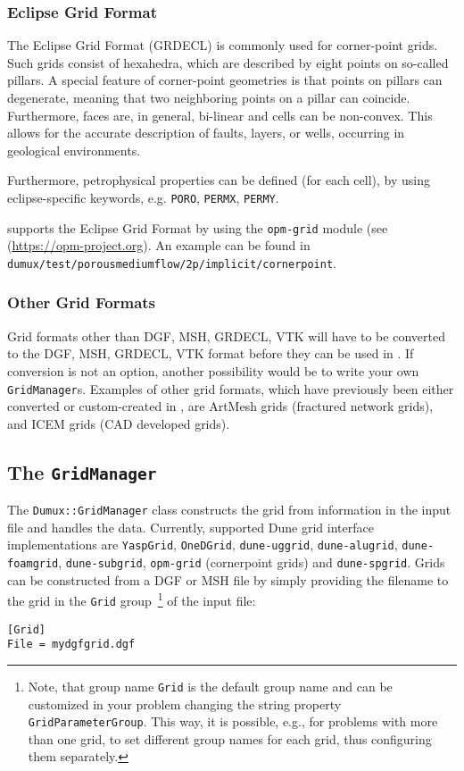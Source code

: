 \subsubsection{Eclipse Grid Format}
The Eclipse Grid Format (GRDECL) is commonly used for corner-point grids.
Such grids consist of hexahedra, which are described by eight points on so-called pillars. A special feature of corner-point geometries is that points on pillars can degenerate, meaning that two neighboring points on a pillar can coincide. Furthermore, faces are, in general, bi-linear and cells can be non-convex. This allows for the accurate description of faults, layers, or wells, occurring in geological environments.

Furthermore, petrophysical properties can be defined (for each cell), by using eclipse-specific keywords, e.g. \texttt{PORO}, \texttt{PERMX}, \texttt{PERMY}.

\Dumux supports the Eclipse Grid Format by using the \texttt{opm-grid} module (see (\url{https://opm-project.org}).
An example can be found in \texttt{dumux/test\allowbreak/porousmediumflow/2p/implicit/cornerpoint}.

\subsubsection{Other Grid Formats}
Grid formats other than DGF, MSH, GRDECL, VTK will have to be converted to the DGF, MSH, GRDECL, VTK format before they can be used in \Dumux.
If conversion is not an option, another possibility would be to write your own \texttt{GridManager}s. Examples of other grid formats,
which have previously been either converted or custom-created in \Dumux, are ArtMesh grids (fractured network grids), and ICEM grids (CAD developed grids).

\subsection{The \Dumux \texttt{GridManager}}
The \texttt{Dumux::GridManager} class constructs the grid from information in the input file and handles the data.
Currently, supported Dune grid interface implementations  are \texttt{YaspGrid}, \texttt{OneDGrid}, \texttt{dune-uggrid}, \texttt{dune-alugrid}, \texttt{dune-foamgrid}, \texttt{dune-subgrid}, \texttt{opm-grid} (cornerpoint grids) and \texttt{dune-spgrid}.
Grids can be constructed from a DGF or MSH file by simply providing the filename to the grid in the \texttt{Grid} group~\footnote{Note,
that group name \texttt{Grid} is the default group name and can be customized in your problem changing the string property \texttt{GridParameterGroup}.
This way, it is possible, e.g., for problems with more than one grid, to set different group names for each grid, thus configuring them separately.}
of the input file:
\begin{lstlisting}[style=DumuxParameterFile]
[Grid]
File = mydgfgrid.dgf
\end{lstlisting}

